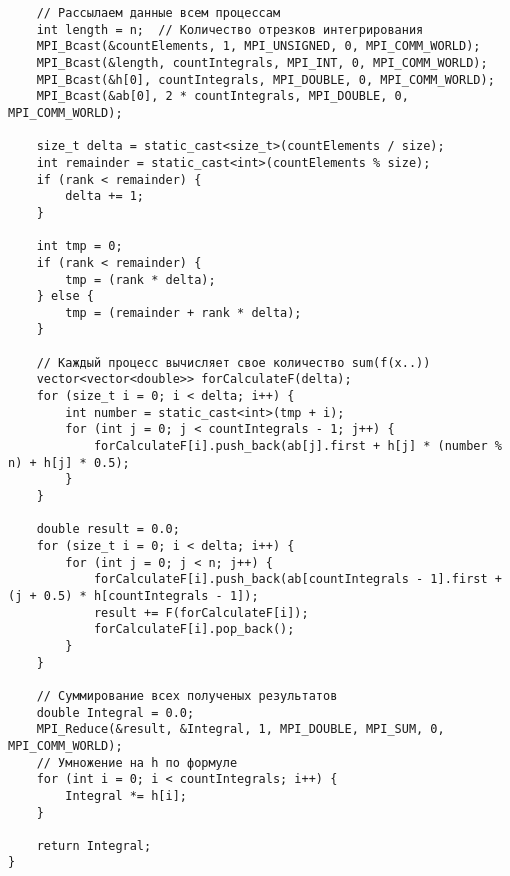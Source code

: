 \documentclass{report}
\begin{document}
\begin{lstlisting}
    // Рассылаем данные всем процессам
    int length = n;  // Количество отрезков интегрирования
    MPI_Bcast(&countElements, 1, MPI_UNSIGNED, 0, MPI_COMM_WORLD);
    MPI_Bcast(&length, countIntegrals, MPI_INT, 0, MPI_COMM_WORLD);
    MPI_Bcast(&h[0], countIntegrals, MPI_DOUBLE, 0, MPI_COMM_WORLD);
    MPI_Bcast(&ab[0], 2 * countIntegrals, MPI_DOUBLE, 0, MPI_COMM_WORLD);

    size_t delta = static_cast<size_t>(countElements / size);
    int remainder = static_cast<int>(countElements % size);
    if (rank < remainder) {
        delta += 1;
    }

    int tmp = 0;
    if (rank < remainder) {
        tmp = (rank * delta);
    } else {
        tmp = (remainder + rank * delta);
    }

    // Каждый процесс вычисляет свое количество sum(f(x..))
    vector<vector<double>> forCalculateF(delta);
    for (size_t i = 0; i < delta; i++) {
        int number = static_cast<int>(tmp + i);
        for (int j = 0; j < countIntegrals - 1; j++) {
            forCalculateF[i].push_back(ab[j].first + h[j] * (number % n) + h[j] * 0.5);
        }
    }

    double result = 0.0;
    for (size_t i = 0; i < delta; i++) {
        for (int j = 0; j < n; j++) {
            forCalculateF[i].push_back(ab[countIntegrals - 1].first + (j + 0.5) * h[countIntegrals - 1]);
            result += F(forCalculateF[i]);
            forCalculateF[i].pop_back();
        }
    }

    // Суммирование всех полученых результатов
    double Integral = 0.0;
    MPI_Reduce(&result, &Integral, 1, MPI_DOUBLE, MPI_SUM, 0, MPI_COMM_WORLD);
    // Умножение на h по формуле
    for (int i = 0; i < countIntegrals; i++) {
        Integral *= h[i];
    }

    return Integral;
}

\end{lstlisting}
\end{document}
